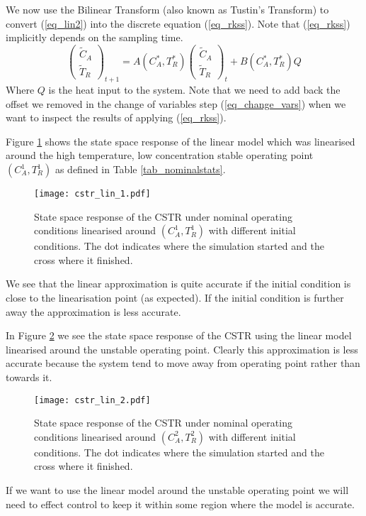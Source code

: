 We now use the Bilinear Transform (also known as Tustin's Transform) to convert (\ref{eq_lin2}) into the discrete equation (\ref{eq_rkss}). Note that (\ref{eq_rkss}) implicitly depends on the sampling time.
\begin{equation}
\begin{pmatrix}
\tilde{C}_A \\ \tilde{T}_R
\end{pmatrix}_{t+1} = A(C_A^*, T_R^*) \begin{pmatrix}
\tilde{C}_A \\ \tilde{T}_R
\end{pmatrix}_{t} + B(C_A^*, T_R^*)Q 
\label{eq_rkss}
\end{equation}
Where $Q$ is the heat input to the system. Note that we need to add back the offset we removed in the change of variables step (\ref{eq_change_vars}) when we want to inspect the results of applying (\ref{eq_rkss}).
 
Figure \ref{fig_cstr_lin_1} shows the state space response of the linear model which was linearised around the high temperature, low concentration stable operating point $(C_A^1,T_R^1)$ as defined in Table \ref{tab_nominalstats}.
\begin{figure}[H] 
\centering
\texttt{[image: cstr\_lin\_1.pdf]}
\caption{State space response of the CSTR under nominal operating conditions linearised around $(C_A^1,T_R^1)$ with different initial conditions. The dot indicates where the simulation started and the cross where it finished.}
\label{fig_cstr_lin_1}
\end{figure}
We see that the linear approximation is quite accurate if the initial condition is close to the linearisation point (as expected). If the initial condition is further away the approximation is less accurate.

In Figure \ref{fig_cstr_lin_2} we see the state space response of the CSTR using the linear model linearised around the unstable operating point. Clearly this approximation is less accurate because the system tend to move away from operating point rather than towards it. 
\begin{figure}[H] 
\centering
\texttt{[image: cstr\_lin\_2.pdf]}
\caption{State space response of the CSTR under nominal operating conditions linearised around $(C_A^2,T_R^2)$ with different initial conditions. The dot indicates where the simulation started and the cross where it finished.}
\label{fig_cstr_lin_2}
\end{figure}
If we want to use the linear model around the unstable operating point we will need to effect control to keep it within some region where the model is accurate.


